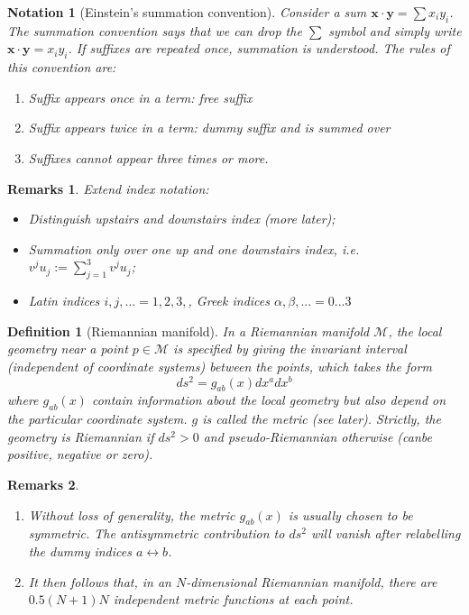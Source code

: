\documentclass[a4paper]{article}
\newtheorem{remarks}{Remarks}[section]
\newtheorem{notation}{Notation}[section]
\theoremstyle{new}
\newtheorem{defi}{Definition}[section]
\begin{document}
\begin{notation}[Einstein's summation convention]
  Consider a sum $\mathbf{x}\cdot \mathbf{y} = \sum x_i y_i$. The summation convention says that we can drop the $\sum$ symbol and simply write $\mathbf{x}\cdot \mathbf{y} = x_i y_i$. If suffixes are repeated once, summation is understood. The rules of this convention are:
  \begin{enumerate}
    \item Suffix appears once in a term: free suffix
    \item Suffix appears twice in a term: dummy suffix and is summed over
    \item Suffixes cannot appear three times or more.
  \end{enumerate}
\end{notation}
\begin{remarks}
Extend index notation:
\begin{itemize}
    \item Distinguish upstairs and downstairs index (more later);
    \item Summation only over one up and one downstairs index, i.e. $v^ju_j:=\sum_{j=1}^3v^ju_j$;
    \item Latin indices $i,j,...=1,2,3,$, Greek indices $\alpha,\beta,...=0...3$
\end{itemize}
\end{remarks}
\begin{defi}[Riemannian manifold]
In a Riemannian manifold $\mathcal{M}$, the local geometry near a point $p\in\mathcal{M}$ is specified by giving the invariant interval (independent of coordinate systems) between the points, which takes the form
$$ds^2=g_{ab}(x)dx^adx^b$$
where $g_{ab}(x)$ contain information about the local geometry but also depend on the particular coordinate system. $g$ is called the metric (see later). Strictly, the geometry is Riemannian if $ds^2>0$ and pseudo-Riemannian otherwise (canbe positive, negative or zero).
\end{defi}
\begin{remarks}\leavevmode
\begin{enumerate}
    \item Without loss of generality, the metric $g_{ab}(x)$ is usually chosen to be symmetric. The antisymmetric contribution to $ds^2$ will vanish after relabelling the dummy indices $a\leftrightarrow b$.
    \item It then follows that, in an $N$-dimensional Riemannian manifold, there are $0.5(N+1)N$ independent metric functions at each point.
\end{enumerate}
\end{remarks}
\end{document}
